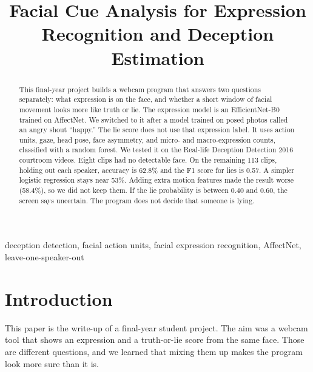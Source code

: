 \documentclass[conference]{IEEEtran}
\begin{document}
\title{Facial Cue Analysis for Expression Recognition and Deception Estimation}

\author{
}

\maketitle

\begin{abstract}
This final-year project builds a webcam program that answers two questions separately: what expression is on the face, and whether a short window of facial movement looks more like truth or lie. The expression model is an EfficientNet-B0 trained on AffectNet. We switched to it after a model trained on posed photos called an angry shout ``happy.'' The lie score does not use that expression label. It uses action units, gaze, head pose, face asymmetry, and micro- and macro-expression counts, classified with a random forest. We tested it on the Real-life Deception Detection 2016 courtroom videos. Eight clips had no detectable face. On the remaining 113 clips, holding out each speaker, accuracy is 62.8\% and the F1 score for lies is 0.57. A simpler logistic regression stays near 53\%. Adding extra motion features made the result worse (58.4\%), so we did not keep them. If the lie probability is between 0.40 and 0.60, the screen says uncertain. The program does not decide that someone is lying.
\end{abstract}

\begin{IEEEkeywords}
deception detection, facial action units, facial expression recognition, AffectNet, leave-one-speaker-out
\end{IEEEkeywords}

\section{Introduction}
This paper is the write-up of a final-year student project. The aim was a webcam tool that shows an expression and a truth-or-lie score from the same face. Those are different questions, and we learned that mixing them up makes the program look more sure than it is.
\end{document}

